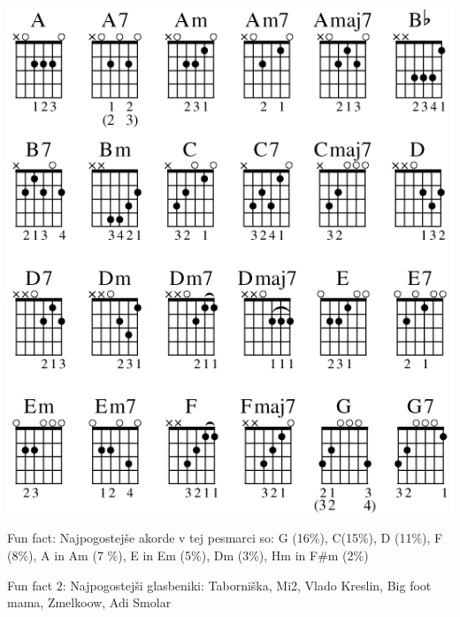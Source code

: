\thispagestyle{empty}
\flushleft\includegraphics[height=\textheight]{imgs/akordi}
\pagebreak


\begin{akordi}

    Fun fact:
    Najpogostejše akorde v tej pesmarci so:
    G (16\%), C(15\%), D (11\%), F (8\%), A in Am (7 \%), E in Em (5\%), Dm (3\%), Hm in F#m (2\%)

    Fun fact 2:
    Najpogostejši glasbeniki: Taborniška, Mi2, Vlado Kreslin, Big foot mama, Zmelkoow, Adi Smolar


\end{akordi}





